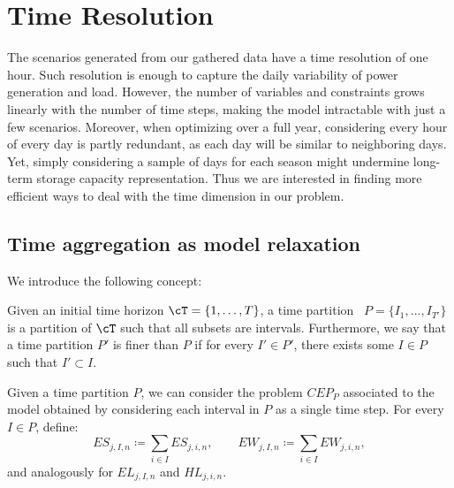 \section{Time Resolution}\label{section:time-resolution}


The scenarios generated from our gathered data have a time resolution of one hour. 
Such resolution is enough to capture the daily variability of power generation and load. 
However, the number of variables and constraints grows linearly with the number of time steps, making the model intractable with just a few scenarios.
Moreover, when optimizing over a full year, considering every hour of every day is partly redundant, as each day will be similar to neighboring days. 
Yet, simply considering a sample of days for each season might undermine long-term storage capacity representation. 
Thus we are interested in finding more efficient ways to deal with the time dimension in our problem.

\subsection{Time aggregation as model relaxation}\label{subsection: relax}

We introduce the following concept:
\begin{definition}
Given an initial time horizon \(\cT = \{1, \ldots, T\}\), a time partition  \(P=\{I_1,...,I_{T'}\}\) is a partition of \(\cT\) such that all subsets are intervals. 
Furthermore, we say that a time partition \(P'\) is finer than \(P\) if for every \(I' \in P'\), there exists some \(I \in P\) such that \(I' \subset I\).
\end{definition}

Given a time partition $P$, we can consider the problem \(CEP_P\) associated to the model obtained by considering each interval in \(P\) as a single time step. 
For every \(I\in P\), define:
\begin{equation}\label{sums scenarios}
ES_{j,I,n} \coloneqq \sum_{i \in I} ES_{j,i,n}, \quad\quad EW_{j,I,n} \coloneqq \sum_{i \in I} EW_{j,i,n}, 
\end{equation}
and analogously for $EL_{j,I,n}$ and $HL_{j,i,n}$.

